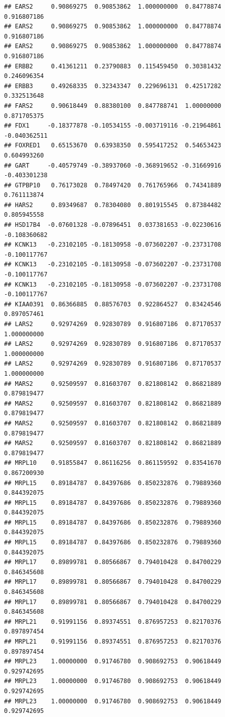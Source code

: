 \documentclass[
]{article}
\begin{document}
\begin{verbatim}
## EARS2     0.90869275  0.90853862  1.000000000  0.84778874  0.916807186
## EARS2     0.90869275  0.90853862  1.000000000  0.84778874  0.916807186
## EARS2     0.90869275  0.90853862  1.000000000  0.84778874  0.916807186
## ERBB2     0.41361211  0.23790883  0.115459450  0.30381432  0.246096354
## ERBB3     0.49268335  0.32343347  0.229696131  0.42517282  0.332513648
## FARS2     0.90618449  0.88380100  0.847788741  1.00000000  0.871705375
## FDX1     -0.18377878 -0.10534155 -0.003719116 -0.21964861 -0.040362511
## FOXRED1   0.65153670  0.63938350  0.595417252  0.54653423  0.604993260
## GART     -0.40579749 -0.38937060 -0.368919652 -0.31669916 -0.403301238
## GTPBP10   0.76173028  0.78497420  0.761765966  0.74341889  0.761113874
## HARS2     0.89349687  0.78304080  0.801915545  0.87384482  0.805945558
## HSD17B4  -0.07601328 -0.07896451  0.037381653 -0.02230616 -0.108360682
## KCNK13   -0.23102105 -0.18130958 -0.073602207 -0.23731708 -0.100117767
## KCNK13   -0.23102105 -0.18130958 -0.073602207 -0.23731708 -0.100117767
## KCNK13   -0.23102105 -0.18130958 -0.073602207 -0.23731708 -0.100117767
## KIAA0391  0.86366885  0.88576703  0.922864527  0.83424546  0.897057461
## LARS2     0.92974269  0.92830789  0.916807186  0.87170537  1.000000000
## LARS2     0.92974269  0.92830789  0.916807186  0.87170537  1.000000000
## LARS2     0.92974269  0.92830789  0.916807186  0.87170537  1.000000000
## MARS2     0.92509597  0.81603707  0.821808142  0.86821889  0.879819477
## MARS2     0.92509597  0.81603707  0.821808142  0.86821889  0.879819477
## MARS2     0.92509597  0.81603707  0.821808142  0.86821889  0.879819477
## MARS2     0.92509597  0.81603707  0.821808142  0.86821889  0.879819477
## MRPL10    0.91855847  0.86116256  0.861159592  0.83541670  0.867200930
## MRPL15    0.89184787  0.84397686  0.850232876  0.79889360  0.844392075
## MRPL15    0.89184787  0.84397686  0.850232876  0.79889360  0.844392075
## MRPL15    0.89184787  0.84397686  0.850232876  0.79889360  0.844392075
## MRPL15    0.89184787  0.84397686  0.850232876  0.79889360  0.844392075
## MRPL17    0.89899781  0.80566867  0.794010428  0.84700229  0.846345608
## MRPL17    0.89899781  0.80566867  0.794010428  0.84700229  0.846345608
## MRPL17    0.89899781  0.80566867  0.794010428  0.84700229  0.846345608
## MRPL21    0.91991156  0.89374551  0.876957253  0.82170376  0.897897454
## MRPL21    0.91991156  0.89374551  0.876957253  0.82170376  0.897897454
## MRPL23    1.00000000  0.91746780  0.908692753  0.90618449  0.929742695
## MRPL23    1.00000000  0.91746780  0.908692753  0.90618449  0.929742695
## MRPL23    1.00000000  0.91746780  0.908692753  0.90618449  0.929742695

\end{verbatim}
\end{document}
